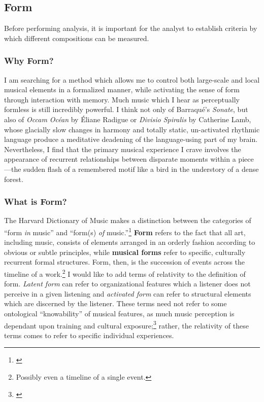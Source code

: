 \subsection{Form}

Before performing analysis, it is important for the analyst to establish criteria by which different compositions can be measured.

\subsubsection{Why Form?}

I am searching for a method which allows me to control both large-scale and local musical elements in a formalized manner, while activating the sense of form through interaction with memory. Much music which I hear as perceptually formless is still incredibly powerful. I think not only of Barraqué's \textit{Sonate}, but also of \textit{Occam Océan} by Éliane Radigue or \textit{Divisio Spiralis} by Catherine Lamb, whose glacially slow changes in harmony and totally static, un-activated rhythmic language produce a meditative deadening of the language-using part of my brain. Nevertheless, I find that the primary musical experience I crave involves the appearance of recurrent relationships between disparate moments within a piece—the sudden flash of a remembered motif like a bird in the understory of a dense forest.

\subsubsection{What is Form?}

The Harvard Dictionary of Music makes a distinction between the categories of ``form \textit{in} music'' and ``form(s) \textit{of} music.''\footnote{\citet[326-328]{dictionary}} \textbf{Form} refers to the fact that all art, including music, consists of elements arranged in an orderly fashion according to obvious or subtle principles, while \textbf{musical forms} refer to specific, culturally recurrent formal structures. Form, then, is the succession of events across the timeline of a work.\footnote{Possibly even a timeline of a single event.} I would like to add terms of relativity to the definition of form. \textit{Latent form} can refer to organizational features which a listener does not perceive in a given listening and \textit{activated form} can refer to structural elements which are discerned by the listener. These terms need not refer to some ontological ``knowability'' of musical features, as much music perception is dependant upon training and cultural exposure;\footnote{\cite[137]{psychology}} rather, the relativity of these terms comes to refer to specific individual experiences.

